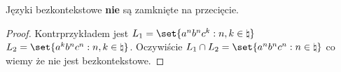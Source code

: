 \begin{theorem}
	Języki bezkontekstowe \textbf{nie} są zamknięte na przecięcie.
\end{theorem}
\begin{proof}
	Kontrprzykładem jest \( L_1 = \set{a^nb^nc^k : n, k \in \natural} \) \( L_2 = \set{a^kb^nc^n : n, k \in \natural} \).
	Oczywiście \( L_1 \cap L_2 = \set{a^nb^nc^n : n \in \natural} \) co wiemy że nie jest bezkontekstowe.
\end{proof}
